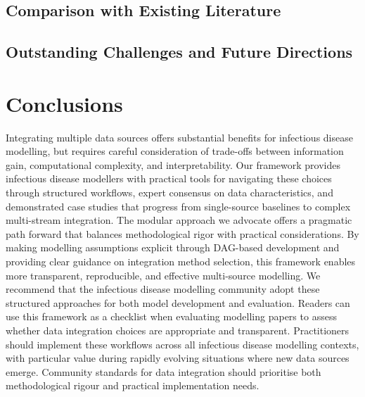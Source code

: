 \documentclass{article}
\begin{document}
\subsection{Comparison with Existing Literature}

\subsection{Outstanding Challenges and Future Directions}



\section{Conclusions}

Integrating multiple data sources offers substantial benefits for infectious disease modelling, but requires careful consideration of trade-offs between information gain, computational complexity, and interpretability.
Our framework provides infectious disease modellers with practical tools for navigating these choices through structured workflows, expert consensus on data characteristics, and demonstrated case studies that progress from single-source baselines to complex multi-stream integration.
The modular approach we advocate offers a pragmatic path forward that balances methodological rigor with practical considerations.
By making modelling assumptions explicit through DAG-based development and providing clear guidance on integration method selection, this framework enables more transparent, reproducible, and effective multi-source modelling.
We recommend that the infectious disease modelling community adopt these structured approaches for both model development and evaluation.
Readers can use this framework as a checklist when evaluating modelling papers to assess whether data integration choices are appropriate and transparent.
Practitioners should implement these workflows across all infectious disease modelling contexts, with particular value during rapidly evolving situations where new data sources emerge.
Community standards for data integration should prioritise both methodological rigour and practical implementation needs.
\end{document}
